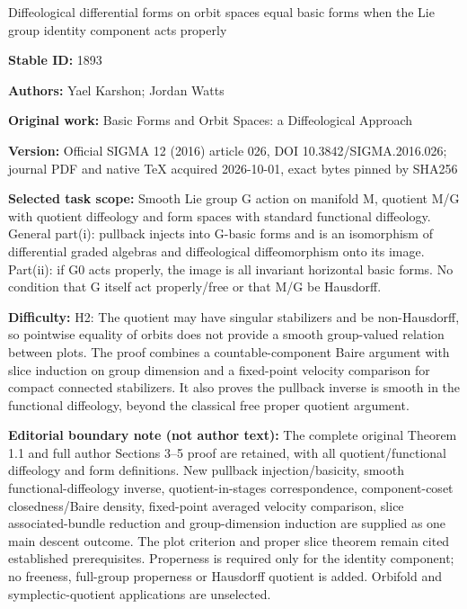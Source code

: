 \documentclass[11pt]{article}
\numberwithin{equation}{section}
\begin{document}
\begin{center}\Large Diffeological differential forms on orbit spaces equal basic forms when the Lie group identity component acts properly\end{center}
\noindent\textbf{Stable ID:} 1893\par
\noindent\textbf{Authors:} Yael Karshon; Jordan Watts\par
\noindent\textbf{Original work:} Basic Forms and Orbit Spaces: a Diffeological Approach\par
\noindent\textbf{Version:} Official SIGMA 12 (2016) article 026, DOI 10.3842/SIGMA.2016.026; journal PDF and native TeX acquired 2026-10-01, exact bytes pinned by SHA256\par
\noindent\textbf{Selected task scope:} Smooth Lie group G action on manifold M, quotient M/G with quotient diffeology and form spaces with standard functional diffeology. General part(i): pullback injects into G-basic forms and is an isomorphism of differential graded algebras and diffeological diffeomorphism onto its image. Part(ii): if G0 acts properly, the image is all invariant horizontal basic forms. No condition that G itself act properly/free or that M/G be Hausdorff.\par
\noindent\textbf{Difficulty:} H2: The quotient may have singular stabilizers and be non-Hausdorff, so pointwise equality of orbits does not provide a smooth group-valued relation between plots. The proof combines a countable-component Baire argument with slice induction on group dimension and a fixed-point velocity comparison for compact connected stabilizers. It also proves the pullback inverse is smooth in the functional diffeology, beyond the classical free proper quotient argument.\par
\noindent\textbf{Editorial boundary note (not author text):} The complete original Theorem 1.1 and full author Sections 3–5 proof are retained, with all quotient/functional diffeology and form definitions. New pullback injection/basicity, smooth functional-diffeology inverse, quotient-in-stages correspondence, component-coset closedness/Baire density, fixed-point averaged velocity comparison, slice associated-bundle reduction and group-dimension induction are supplied as one main descent outcome. The plot criterion and proper slice theorem remain cited established prerequisites. Properness is required only for the identity component; no freeness, full-group properness or Hausdorff quotient is added. Orbifold and symplectic-quotient applications are unselected.\par
\end{document}
